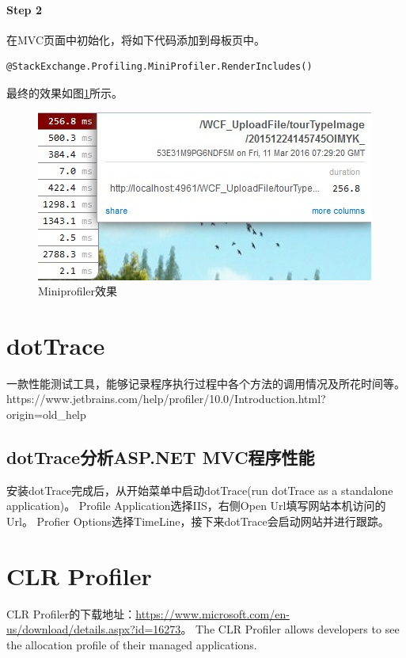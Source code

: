 \documentclass{book}
\begin{document}
\paragraph{Step 2}在MVC页面中初始化，将如下代码添加到母板页中。

\begin{lstlisting}[language={[Sharp]C}]
@StackExchange.Profiling.MiniProfiler.RenderIncludes()
\end{lstlisting}

最终的效果如图\ref{fig:MiniprofilerEffect}所示。

\begin{figure}[htbp]
	\centering
	\includegraphics[scale=0.8]{MiniprofilerEffect.jpg}
	\caption{Miniprofiler效果}
	\label{fig:MiniprofilerEffect}
\end{figure}

\section{dotTrace}

一款性能测试工具，能够记录程序执行过程中各个方法的调用情况及所花时间等。
https://www.jetbrains.com/help/profiler/10.0/Introduction.html?origin=old\_help

\subsection{dotTrace分析ASP.NET MVC程序性能}

安装dotTrace完成后，从开始菜单中启动dotTrace(run dotTrace as a standalone application)。
Profile Application选择IIS，右侧Open Url填写网站本机访问的Url。
Profier Options选择TimeLine，接下来dotTrace会启动网站并进行跟踪。

\section{CLR Profiler}

CLR Profiler的下载地址：\url{https://www.microsoft.com/en-us/download/details.aspx?id=16273}。
The CLR Profiler allows developers to see the allocation profile of their managed applications.
\end{document}
